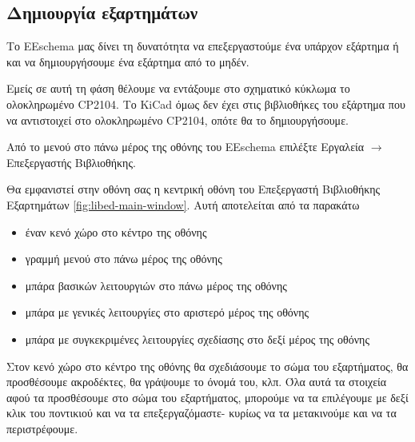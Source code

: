\documentclass[a4paper]{article}
\begin{document}

\subsection{Δημιουργία εξαρτημάτων}
Το \textenglish{EEschema} μας δίνει τη δυνατότητα να επεξεργαστούμε ένα υπάρχον εξάρτημα ή και να δημιουργήσουμε ένα εξάρτημα από το μηδέν.

Εμείς σε αυτή τη φάση θέλουμε να εντάξουμε στο σχηματικό κύκλωμα το ολοκληρωμένο \textenglish{CP2104}. Το \textenglish{KiCad} όμως δεν έχει στις βιβλιοθήκες του εξάρτημα που να αντιστοιχεί στο ολοκληρωμένο \textenglish{CP2104}, οπότε θα το δημιουργήσουμε.

Από το μενού στο πάνω μέρος της οθόνης του \textenglish{EEschema} επιλέξτε Εργαλεία $\rightarrow$ Επεξεργαστής Βιβλιοθήκης.

Θα εμφανιστεί στην οθόνη σας η κεντρική οθόνη του Επεξεργαστή Βιβλιοθήκης Εξαρτημάτων \ref{fig:libed-main-window}. Αυτή αποτελείται από τα παρακάτω
\begin{itemize}
    \item έναν κενό χώρο στο κέντρο της οθόνης
    \item γραμμή μενού στο πάνω μέρος της οθόνης
    \item μπάρα βασικών λειτουργιών στο πάνω μέρος της οθόνης
    \item μπάρα με γενικές λειτουργίες στο αριστερό μέρος της οθόνης
    \item μπάρα με συγκεκριμένες λειτουργίες σχεδίασης στο δεξί μέρος της οθόνης
\end{itemize}

Στον κενό χώρο στο κέντρο της οθόνης θα σχεδιάσουμε το σώμα του εξαρτήματος, θα προσθέσουμε ακροδέκτες, θα γράψουμε το όνομά του, κλπ. Όλα αυτά τα στοιχεία αφού τα προσθέσουμε στο σώμα του εξαρτήματος, μπορούμε να τα επιλέγουμε με δεξί κλικ του ποντικιού και να τα επεξεργαζόμαστε- κυρίως να τα μετακινούμε και να τα περιστρέφουμε.
\end{document}
